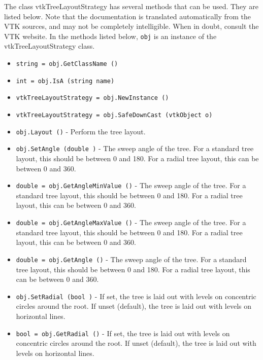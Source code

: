 The class vtkTreeLayoutStrategy has several methods that can be used.
  They are listed below.
Note that the documentation is translated automatically from the VTK sources,
and may not be completely intelligible.  When in doubt, consult the VTK website.
In the methods listed below, \verb|obj| is an instance of the vtkTreeLayoutStrategy class.
\begin{itemize}
\item  \verb|string = obj.GetClassName ()|

\item  \verb|int = obj.IsA (string name)|

\item  \verb|vtkTreeLayoutStrategy = obj.NewInstance ()|

\item  \verb|vtkTreeLayoutStrategy = obj.SafeDownCast (vtkObject o)|

\item  \verb|obj.Layout ()| -  Perform the tree layout.

\item  \verb|obj.SetAngle (double )| -  The sweep angle of the tree.
 For a standard tree layout, this should be between 0 and 180.
 For a radial tree layout, this can be between 0 and 360.

\item  \verb|double = obj.GetAngleMinValue ()| -  The sweep angle of the tree.
 For a standard tree layout, this should be between 0 and 180.
 For a radial tree layout, this can be between 0 and 360.

\item  \verb|double = obj.GetAngleMaxValue ()| -  The sweep angle of the tree.
 For a standard tree layout, this should be between 0 and 180.
 For a radial tree layout, this can be between 0 and 360.

\item  \verb|double = obj.GetAngle ()| -  The sweep angle of the tree.
 For a standard tree layout, this should be between 0 and 180.
 For a radial tree layout, this can be between 0 and 360.

\item  \verb|obj.SetRadial (bool )| -  If set, the tree is laid out with levels on concentric circles 
 around the root. If unset (default), the tree is laid out with 
 levels on horizontal lines.

\item  \verb|bool = obj.GetRadial ()| -  If set, the tree is laid out with levels on concentric circles 
 around the root. If unset (default), the tree is laid out with 
 levels on horizontal lines.


\end{itemize}
